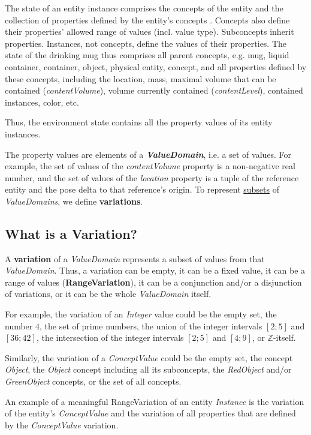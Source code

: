 The state of an entity instance comprises the concepts of the entity and the collection of properties defined by the entity's concepts \cite{conceptHierarchyGeriatronicsSummit24}. Concepts also define their properties' allowed range of values (incl. value type). Subconcepts inherit properties. Instances, not concepts, define the values of their properties. The state of the drinking mug thus comprises all parent concepts, e.g. mug, liquid container, container, object, physical entity, concept, and all properties defined by these concepts, including the location, mass, maximal volume that can be contained (\textit{contentVolume}), volume currently contained (\textit{contentLevel}), contained instances, color, etc.

Thus, the environment state contains all the property values of its entity instances.

The property values are elements of a \textbf{\textit{ValueDomain}}, i.e. a set of values. For example, the set of values of the \textit{contentVolume} property is a non-negative real number, and the set of values of the \textit{location} property is a tuple of the reference entity and the pose delta to that reference's origin. To represent \underline{subsets} of \textit{ValueDomains}, we define \textbf{variations}.

\subsection{What is a Variation?}\label{ssec:variations}
A \textbf{variation} of a \textit{ValueDomain} represents a subset of values from that \textit{ValueDomain}. Thus, a variation can be empty, it can be a fixed value, it can be a range of values (\textbf{RangeVariation}), it can be a conjunction and/or a disjunction of variations, or it can be the whole \textit{ValueDomain} itself.

For example, the variation of an \textit{Integer} value could be the empty set, the number $4$, the set of prime numbers, the union of the integer intervals $\left[2; 5\right]$ and $\left[36; 42\right]$, the intersection of the integer intervals $\left[2; 5\right]$ and $\left[4; 9\right]$, or $\mathbb{Z}$-itself.

Similarly, the variation of a \textit{ConceptValue} could be the empty set, the concept \textit{Object}, the \textit{Object} concept including all its subconcepts, the \textit{RedObject} and/or \textit{GreenObject} concepts, or the set of all concepts.

An example of a meaningful RangeVariation of an entity \textit{Instance} is the variation of the entity's \textit{ConceptValue} and the variation of all properties that are defined by the \textit{ConceptValue} variation.

